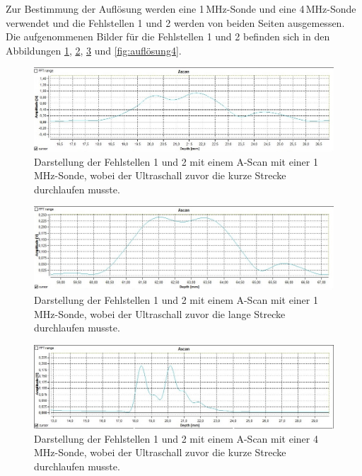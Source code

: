 Zur Bestimmung der Auflösung werden eine 1\,MHz-Sonde und eine 4\,MHz-Sonde verwendet
und die Fehlstellen 1 und 2 werden von beiden Seiten ausgemessen.
Die aufgenommenen Bilder für die Fehlstellen 1 und 2 befinden sich in den Abbildungen \ref{fig:auflösung1},
\ref{fig:auflösung2}, \ref{fig:auflösung3} und \ref{fig:auflösung4}.

\begin{figure}[H]
  \centering
  \includegraphics[width=\textwidth]{data/1mhzdoppelteFehlstellekurzelLaufzeitGedrehtwieinZeichnung.jpeg}
  \caption{Darstellung der Fehlstellen 1 und 2 mit einem A-Scan mit einer 1\,MHz-Sonde, wobei der Ultraschall
  zuvor die kurze Strecke durchlaufen musste.}
  \label{fig:auflösung1}
\end{figure}

\begin{figure}[H]
  \centering
  \includegraphics[width=\textwidth]{data/1mhzdoppelteFehlstellelangeLaufzeit.jpg}
  \caption{Darstellung der Fehlstellen 1 und 2 mit einem A-Scan mit einer 1\,MHz-Sonde, wobei der Ultraschall
  zuvor die lange Strecke durchlaufen musste.}
  \label{fig:auflösung2}
\end{figure}

\begin{figure}[H]
  \centering
  \includegraphics[width=\textwidth]{data/4mhzdoppelteFehlstellekurzelLaufzeitGedrehtwieinZeichnung.jpg}
  \caption{Darstellung der Fehlstellen 1 und 2 mit einem A-Scan mit einer 4\,MHz-Sonde, wobei der Ultraschall
  zuvor die kurze Strecke durchlaufen musste.}
  \label{fig:auflösung3}
\end{figure}

